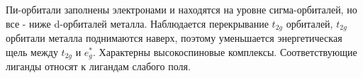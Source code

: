 \begin{itemize}
\begin{figure}[H]
\end{figure}
Пи-орбитали заполнены электронами и находятся на
уровне сигма-орбиталей, но все - ниже d-орбиталей
металла. Наблюдается перекрывание $t_{2g}$ орбиталей, $t_{2g}$ орбитали металла поднимаются наверх, поэтому
уменьшается энергетическая щель между $t_{2g}$ и $e_g^*$. Характерны высокоспиновые комплексы.
Соответствующие лиганды относят к лигандам слабого
поля. 
\end{itemize}









